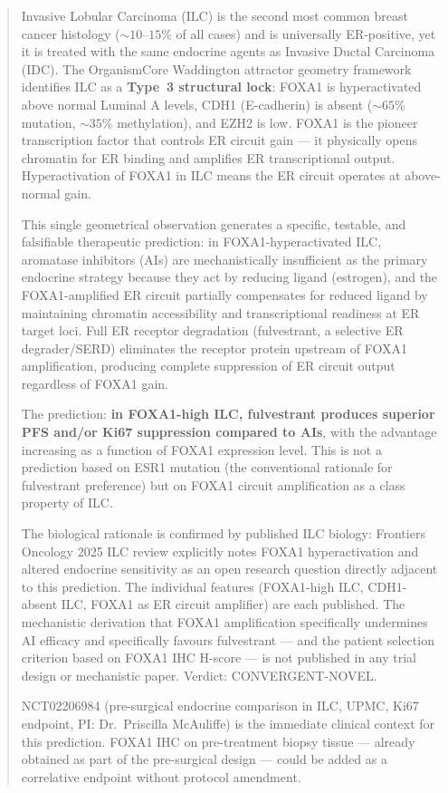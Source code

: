 \documentclass[12pt, a4paper]{article}
\begin{document}
\vspace{0.8em}

\begin{abstract}
\noindent
Invasive Lobular Carcinoma (ILC) is the second most
common breast cancer histology (${\sim}10$--$15\%$ of
all cases) and is universally ER-positive, yet it is
treated with the same endocrine agents as Invasive
Ductal Carcinoma (IDC). The OrganismCore Waddington
attractor geometry framework identifies ILC as a
\textbf{Type~3 structural lock}: FOXA1 is hyperactivated
above normal Luminal A levels, CDH1 (E-cadherin) is
absent (${\sim}65\%$ mutation, ${\sim}35\%$ methylation),
and EZH2 is low. FOXA1 is the pioneer transcription
factor that controls ER circuit gain --- it physically
opens chromatin for ER binding and amplifies ER
transcriptional output. Hyperactivation of FOXA1 in
ILC means the ER circuit operates at above-normal
gain.

This single geometrical observation generates a
specific, testable, and falsifiable therapeutic
prediction: in FOXA1-hyperactivated ILC, aromatase
inhibitors (AIs) are mechanistically insufficient
as the primary endocrine strategy because they act
by reducing ligand (estrogen), and the FOXA1-amplified
ER circuit partially compensates for reduced ligand
by maintaining chromatin accessibility and
transcriptional readiness at ER target loci. Full
ER receptor degradation (fulvestrant, a selective
ER degrader/SERD) eliminates the receptor protein
upstream of FOXA1 amplification, producing complete
suppression of ER circuit output regardless of FOXA1
gain.

The prediction: \textbf{in FOXA1-high ILC,
fulvestrant produces superior PFS and/or Ki67
suppression compared to AIs}, with the advantage
increasing as a function of FOXA1 expression level.
This is not a prediction based on ESR1 mutation
(the conventional rationale for fulvestrant
preference) but on FOXA1 circuit amplification
as a class property of ILC.

The biological rationale is confirmed by published
ILC biology: Frontiers Oncology 2025 ILC review
explicitly notes FOXA1 hyperactivation and altered
endocrine sensitivity as an open research question
directly adjacent to this prediction. The individual
features (FOXA1-high ILC, CDH1-absent ILC, FOXA1 as
ER circuit amplifier) are each published. The
mechanistic derivation that FOXA1 amplification
specifically undermines AI efficacy and specifically
favours fulvestrant --- and the patient selection
criterion based on FOXA1 IHC H-score --- is not
published in any trial design or mechanistic paper.
Verdict: CONVERGENT-NOVEL.

NCT02206984 (pre-surgical endocrine comparison in
ILC, UPMC, Ki67 endpoint, PI: Dr.\ Priscilla
McAuliffe) is the immediate clinical context for
this prediction. FOXA1 IHC on pre-treatment biopsy
tissue --- already obtained as part of the
pre-surgical design --- could be added as a
correlative endpoint without protocol amendment.
\end{abstract}
\end{document}
